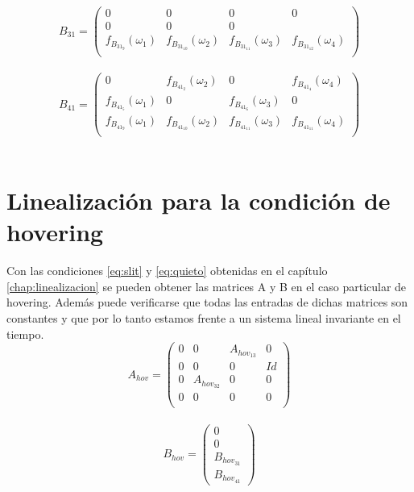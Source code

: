 \begin{equation}
B_{31}=\left(\begin{array}{cccc}
0 & 0 & 0 &0\\
0&0&0\\
f_{B_{31_9}}(\omega_1) & f_{B_{31_10}}(\omega_2) & f_{B_{31_11}}(\omega_3) &f_{B_{31_12}}(\omega_4)\\
\end{array}\right)
\end{equation}\\

\begin{equation}
B_{41}=\left(\begin{array}{cccc}
0 & f_{B_{41_2}}(\omega_2) & 0 & f_{B_{41_4}}(\omega_4)\\
f_{B_{41_5}}(\omega_1)&0&f_{B_{41_6}}(\omega_3)&0\\
f_{B_{41_9}}(\omega_1) & f_{B_{41_10}}(\omega_2) & f_{B_{41_11}}(\omega_3) &f_{B_{41_11}}(\omega_4)\\
\end{array}\right)
\end{equation}\\

\section{Linealizaci\'on para la condici\'on de hovering}
Con las condiciones \ref{eq:slit} y \ref{eq:quieto} obtenidas en el cap\'itulo \ref{chap:linealizacion} se pueden obtener las matrices A y B en el caso particular de hovering. Adem\'as puede verificarse que todas las entradas de dichas matrices son constantes y que por lo tanto estamos frente a un sistema lineal invariante en el tiempo.
\begin{equation}
\label{eq:Ahov}
A_{hov}=\left(\begin{array}{cccc}
0 & 0 & A_{hov_{13}} & 0 \\
0 & 0 & 0      & Id\\
0 & A_{hov_{32}} & 0 & 0\\
0 & 0      & 0 & 0 \\    
\end{array}\right)
\end{equation}\\


\begin{equation}
\label{eq:Bhov}
B_{hov}=\left(\begin{array}{c}
0\\
0\\
B_{hov_{31}}\\
B_{hov_{41}} 
\end{array}\right)
\end{equation}\\

